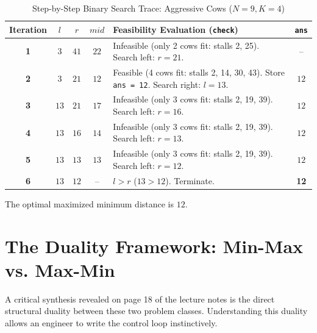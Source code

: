 \documentclass[10pt,journal,compsoc,onecolumn]{IEEEtran}
\begin{document}
\begin{table}[h]
\centering
\caption{Step-by-Step Binary Search Trace: Aggressive Cows ($N = 9, K = 4$)}
\label{tab:cows_trace}
\begin{tabular}{@{}cccclc@{}}
\toprule
\textbf{Iteration} & $l$ & $r$ & $mid$ & \textbf{Feasibility Evaluation (\texttt{check})} & \texttt{ans} \\ \midrule
\textbf{1} & $3$ & $41$ & $22$ & Infeasible (only 2 cows fit: stalls 2, 25). Search left: $r = 21$. & -- \\
\textbf{2} & $3$ & $21$ & $12$ & Feasible (4 cows fit: stalls 2, 14, 30, 43). Store \texttt{ans = 12}. Search right: $l = 13$. & $12$ \\
\textbf{3} & $13$ & $21$ & $17$ & Infeasible (only 3 cows fit: stalls 2, 19, 39). Search left: $r = 16$. & $12$ \\
\textbf{4} & $13$ & $16$ & $14$ & Infeasible (only 3 cows fit: stalls 2, 19, 39). Search left: $r = 13$. & $12$ \\
\textbf{5} & $13$ & $13$ & $13$ & Infeasible (only 3 cows fit: stalls 2, 19, 39). Search left: $r = 12$. & $12$ \\
\textbf{6} & $13$ & $12$ & -- & $l > r$ ($13 > 12$). Terminate. & \textbf{12} \\ \bottomrule
\end{tabular}
\end{table}

The optimal maximized minimum distance is \textbf{$12$}.

\section{The Duality Framework: Min-Max vs. Max-Min}
\label{sec:duality}

A critical synthesis revealed on page 18 of the lecture notes is the direct structural duality between these two problem classes. Understanding this duality allows an engineer to write the control loop instinctively.
\end{document}
